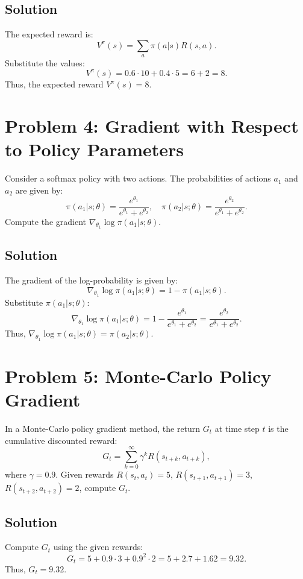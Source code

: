 \documentclass{article}
\begin{document}
\subsection*{Solution}
The expected reward is:
\[
V^{\pi}(s) = \sum_a \pi(a | s) R(s, a).
\]
Substitute the values:
\[
V^{\pi}(s) = 0.6 \cdot 10 + 0.4 \cdot 5 = 6 + 2 = 8.
\]
Thus, the expected reward \( V^{\pi}(s) = 8 \).

\section*{Problem 4: Gradient with Respect to Policy Parameters}
Consider a softmax policy with two actions. The probabilities of actions \( a_1 \) and \( a_2 \) are given by:
\[
\pi(a_1 | s; \theta) = \frac{e^{\theta_1}}{e^{\theta_1} + e^{\theta_2}}, \quad \pi(a_2 | s; \theta) = \frac{e^{\theta_2}}{e^{\theta_1} + e^{\theta_2}}.
\]
Compute the gradient \( \nabla_{\theta_1} \log \pi(a_1 | s; \theta) \).

\subsection*{Solution}
The gradient of the log-probability is given by:
\[
\nabla_{\theta_1} \log \pi(a_1 | s; \theta) = 1 - \pi(a_1 | s; \theta).
\]
Substitute \( \pi(a_1 | s; \theta) \):
\[
\nabla_{\theta_1} \log \pi(a_1 | s; \theta) = 1 - \frac{e^{\theta_1}}{e^{\theta_1} + e^{\theta_2}} = \frac{e^{\theta_2}}{e^{\theta_1} + e^{\theta_2}}.
\]
Thus, \( \nabla_{\theta_1} \log \pi(a_1 | s; \theta) = \pi(a_2 | s; \theta) \).

\section*{Problem 5: Monte-Carlo Policy Gradient}
In a Monte-Carlo policy gradient method, the return \( G_t \) at time step \( t \) is the cumulative discounted reward:
\[
G_t = \sum_{k=0}^{\infty} \gamma^k R(s_{t+k}, a_{t+k}),
\]
where \( \gamma = 0.9 \). Given rewards \( R(s_t, a_t) = 5 \), \( R(s_{t+1}, a_{t+1}) = 3 \), \( R(s_{t+2}, a_{t+2}) = 2 \), compute \( G_t \).

\subsection*{Solution}
Compute \( G_t \) using the given rewards:
\[
G_t = 5 + 0.9 \cdot 3 + 0.9^2 \cdot 2 = 5 + 2.7 + 1.62 = 9.32.
\]
Thus, \( G_t = 9.32 \).
\end{document}
